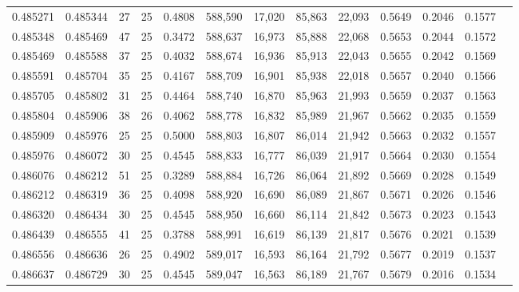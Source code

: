\begin{tabular}{rrrrrrrrrrrrr}
0.485271 & 0.485344 &    27 &  25 &                                     0.4808 & 588,590 &  17,020 &  85,863 &  22,093 & 0.5649 & 0.2046 & 0.1577 \\
0.485348 & 0.485469 &    47 &  25 &                                     0.3472 & 588,637 &  16,973 &  85,888 &  22,068 & 0.5653 & 0.2044 & 0.1572 \\
0.485469 & 0.485588 &    37 &  25 &                                     0.4032 & 588,674 &  16,936 &  85,913 &  22,043 & 0.5655 & 0.2042 & 0.1569 \\
0.485591 & 0.485704 &    35 &  25 &                                     0.4167 & 588,709 &  16,901 &  85,938 &  22,018 & 0.5657 & 0.2040 & 0.1566 \\
0.485705 & 0.485802 &    31 &  25 &                                     0.4464 & 588,740 &  16,870 &  85,963 &  21,993 & 0.5659 & 0.2037 & 0.1563 \\
0.485804 & 0.485906 &    38 &  26 &                                     0.4062 & 588,778 &  16,832 &  85,989 &  21,967 & 0.5662 & 0.2035 & 0.1559 \\
0.485909 & 0.485976 &    25 &  25 &                                     0.5000 & 588,803 &  16,807 &  86,014 &  21,942 & 0.5663 & 0.2032 & 0.1557 \\
0.485976 & 0.486072 &    30 &  25 &                                     0.4545 & 588,833 &  16,777 &  86,039 &  21,917 & 0.5664 & 0.2030 & 0.1554 \\
0.486076 & 0.486212 &    51 &  25 &                                     0.3289 & 588,884 &  16,726 &  86,064 &  21,892 & 0.5669 & 0.2028 & 0.1549 \\
0.486212 & 0.486319 &    36 &  25 &                                     0.4098 & 588,920 &  16,690 &  86,089 &  21,867 & 0.5671 & 0.2026 & 0.1546 \\
0.486320 & 0.486434 &    30 &  25 &                                     0.4545 & 588,950 &  16,660 &  86,114 &  21,842 & 0.5673 & 0.2023 & 0.1543 \\
0.486439 & 0.486555 &    41 &  25 &                                     0.3788 & 588,991 &  16,619 &  86,139 &  21,817 & 0.5676 & 0.2021 & 0.1539 \\
0.486556 & 0.486636 &    26 &  25 &                                     0.4902 & 589,017 &  16,593 &  86,164 &  21,792 & 0.5677 & 0.2019 & 0.1537 \\
0.486637 & 0.486729 &    30 &  25 &                                     0.4545 & 589,047 &  16,563 &  86,189 &  21,767 & 0.5679 & 0.2016 & 0.1534 \\

\end{tabular}
